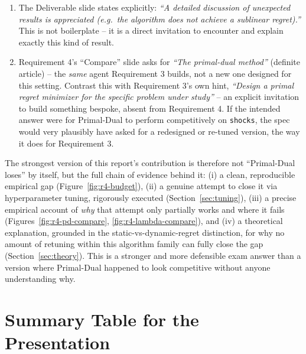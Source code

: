 \documentclass[11pt,a4paper]{article}
\newcommand{\1}{\mathbf{1}}
\begin{document}
\begin{enumerate}[leftmargin=1.4em]
  \item The Deliverable slide states explicitly: \emph{``A detailed discussion of unexpected results is appreciated (e.g.\ the algorithm does not achieve a sublinear regret).''} This is not boilerplate -- it is a direct invitation to encounter and explain exactly this kind of result.
  \item Requirement 4's ``Compare'' slide asks for \emph{``The primal-dual method''} (definite article) -- the \emph{same} agent Requirement 3 builds, not a new one designed for this setting. Contrast this with Requirement 3's own hint, \emph{``Design a primal regret minimizer for the specific problem under study''} -- an explicit invitation to build something bespoke, absent from Requirement 4. If the intended answer were for Primal-Dual to perform competitively on \texttt{shocks}, the spec would very plausibly have asked for a redesigned or re-tuned version, the way it does for Requirement 3.
\end{enumerate}

The strongest version of this report's contribution is therefore not ``Primal-Dual loses'' by itself, but the full chain of evidence behind it: (i) a clean, reproducible empirical gap (Figure~\ref{fig:r4-budget}), (ii) a genuine attempt to close it via hyperparameter tuning, rigorously executed (Section~\ref{sec:tuning}), (iii) a precise empirical account of \emph{why} that attempt only partially works and where it fails (Figures~\ref{fig:r4-pd-compare}, \ref{fig:r4-lambda-compare}), and (iv) a theoretical explanation, grounded in the static-vs-dynamic-regret distinction, for why no amount of retuning within this algorithm family can fully close the gap (Section~\ref{sec:theory}). This is a stronger and more defensible exam answer than a version where Primal-Dual happened to look competitive without anyone understanding why.

\section{Summary Table for the Presentation}
\end{document}

